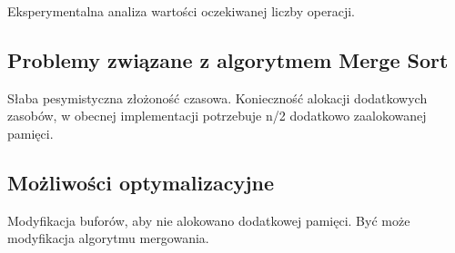 Eksperymentalna analiza wartości oczekiwanej liczby operacji.

\begin{figure}[H]
	\centering
	
	\caption[]{}
	\label{fig:merge-sort-optimistic-average-pessimistic-case}
\end{figure}

\subsection{Problemy związane z algorytmem Merge Sort}
Słaba pesymistyczna złożoność czasowa.
Konieczność alokacji dodatkowych zasobów, w obecnej implementacji potrzebuje n/2 dodatkowo zaalokowanej pamięci.

\subsection{Możliwości optymalizacyjne}
Modyfikacja buforów, aby nie alokowano dodatkowej pamięci. Być może modyfikacja algorytmu mergowania.